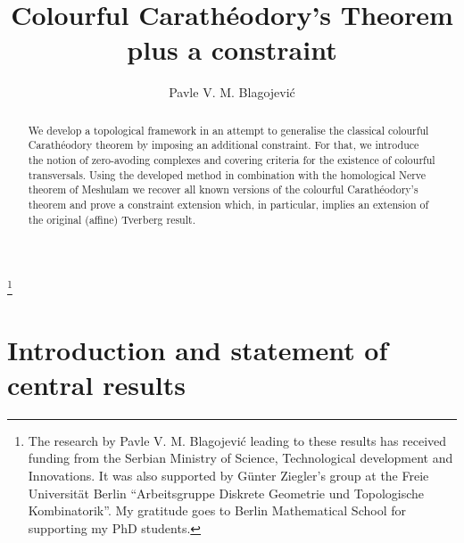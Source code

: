 \documentclass[a4paper,11pt,reqno, english]{amsart}
\theoremstyle{definition}
\theoremstyle{remark}
\begin{document}

\title[Colourful Carath\'eodory's Theorem plus a constraint]{Colourful Carath\'eodory's Theorem plus a constraint}


\author[Blagojevi\'c]{Pavle V. M. Blagojevi\'{c}}
\thanks{The research by Pavle V. M. Blagojevi\'{c} leading to these results has
received funding from the Serbian Ministry of Science, Technological development and Innovations. It was also supported by G\"unter Ziegler's group at the Freie Universit\"at Berlin ``Arbeitsgruppe Diskrete Geometrie und Topologische Kombinatorik''. My gratitude goes to Berlin Mathematical School for supporting my PhD students.}
\address{Inst. Math., FU Berlin, Arnimallee 2, 14195 Berlin, Germany\hfill\break
	\mbox{\hspace{4mm}}Mat. Institut SANU, Knez Mihailova 36, 11001 Beograd, Serbia}


\begin{abstract}
	We develop a topological framework in an attempt to generalise the classical colourful Carath\'eodory theorem by imposing an additional constraint.
	For that, we introduce the notion of zero-avoding complexes and covering criteria for the existence of colourful transversals.
	Using the developed method in combination with the homological Nerve theorem of Meshulam we recover all known versions of the colourful Carath\'eodory's theorem and prove a constraint extension which, in particular, implies an extension of the original (affine) Tverberg result.
\end{abstract}


\maketitle



\bigskip
\section{Introduction and statement of central results}
\bigskip
\end{document}
